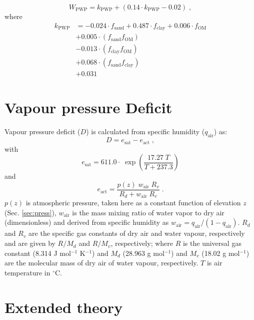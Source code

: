 \documentclass[gmd, manuscript]{copernicus}
\begin{document}
\begin{equation}
W_{\text{PWP}} = k_\text{PWP}+(0.14\cdot k_\text{PWP}-0.02) \;,
\end{equation}
where
\begin{align}
k_\text{PWP} & = -0.024 \cdot f_{\text{sand}} + 0.487 \cdot f_{\text{clay}} + 0.006 \cdot f_{\text{OM}} \\
                  &+0.005 \cdot ( f_{\text{sand}} f_{\text{OM}} )\\
                  &-0.013 \cdot ( f_{\text{clay}} f_{\text{OM}} )\\
                  &+0.068 \cdot ( f_{\text{sand}} f_{\text{clay}} )\\
                  &+0.031
\end{align}


\section{Vapour pressure Deficit}
\label{sec:vpd}
Vapour pressure deficit ($D$) is calculated from specific humidity
($q_\text{air}$) as:
\begin{equation}
    D = e_\text{sat} - e_\text{act} \;,
\end{equation}
with 
\begin{equation}
    e_\text{sat} = 611.0 \cdot \; \exp \left( \frac{17.27 \; T}{T + 237.3} \right)
\end{equation}
and
\begin{equation}
    e_\text{act} = \frac{ p(z) \; w_\text{air} \; R_v }{ R_d + w_\text{air} \; R_v} \;.
\end{equation}
$p(z)$ is atmospheric pressure, taken here as a constant function of elevation $z$ (Sec. \ref{sec:press}), $w_\text{air}$ is the mass mixing ratio of water vapor to dry air (dimensionless) and derived from specific humidity as $w_\text{air} = q_\text{air} / ( 1 - q_\text{air} )$. $R_d$ and $R_v$ are the specific gas constants of dry air and water vapour, respectively and are given by $R/M_d$ and $R/M_v$, respectively; where $R$ is the universal gas constant (8.314 J mol$^{-1}$ K$^{-1}$) and $M_d$ (28.963 g mol$^{-1}$) and $M_v$ (18.02 g mol$^{-1}$) are the molecular mass of dry air of water vapour, respectively. $T$ is air temperature in $^{\circ}$C.


\section{Extended theory}
\end{document}
